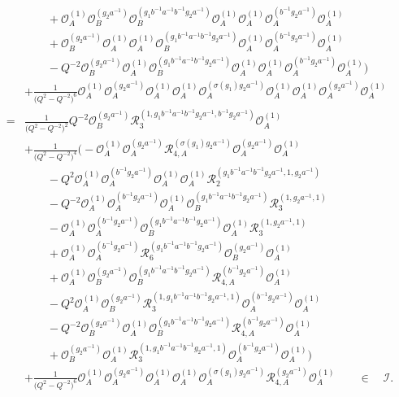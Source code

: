 \documentclass{amsart}
\newcommand{\Oa}{\mathcal O_A}
\newcommand{\Ob}{\mathcal O_B}
\newcommand{\R}{\mathcal R}
\begin{document}
\begin{align*}
&\qquad+\Oa^{(1)}\Ob^{(g_2a^{-1})}\Ob^{(g_1b^{-1}a^{-1}b^{-1}g_2a^{-1})}\Oa^{(1)}\Oa^{(1)}\Oa^{(b^{-1}g_2a^{-1})}\Oa^{(1)}\\
&\qquad+\Ob^{(g_2a^{-1})}\Oa^{(1)}\Oa^{(1)}\Ob^{(g_1b^{-1}a^{-1}b^{-1}g_2a^{-1})}\Oa^{(1)}\Oa^{(b^{-1}g_2a^{-1})}\Oa^{(1)}\\
&\qquad-Q^{-2}\Ob^{(g_2a^{-1})}\Oa^{(1)}\Ob^{(g_1b^{-1}a^{-1}b^{-1}g_2a^{-1})}\Oa^{(1)}\Oa^{(1)}\Oa^{(b^{-1}g_2a^{-1})}\Oa^{(1)}\Big)\\
&+\frac1{\big(Q^2-Q^{-2}\big)^6}\Oa^{(1)}\Oa^{(g_2a^{-1})}\Oa^{(1)}\Oa^{(1)}\Oa^{(\sigma(g_1)g_2a^{-1})}\Oa^{(1)}\Oa^{(1)}\Oa^{(g_2a^{-1})}\Oa^{(1)}\\
=&\frac1{\big(Q^2-Q^{-2}\big)^2}Q^{-2}\Ob^{(g_2a^{-1})}\R_{3}^{(1,g_1b^{-1}a^{-1}b^{-1}g_2a^{-1},b^{-1}g_2a^{-1})}\Oa^{(1)}\\
&+\frac1{\big(Q^2-Q^{-2}\big)^4}\Big(-\Oa^{(1)}\Oa^{(g_2a^{-1})}\R_{4,A}^{(\sigma(g_1)g_2a^{-1})}\Oa^{(g_2a^{-1})}\Oa^{(1)}\\
&\qquad-Q^2\Oa^{(1)}\Oa^{(b^{-1}g_2a^{-1})}\Oa^{(1)}\Oa^{(1)}\R_{2}^{(g_1b^{-1}a^{-1}b^{-1}g_2a^{-1},1,g_2a^{-1})}\\
&\qquad-Q^{-2}\Oa^{(1)}\Oa^{(b^{-1}g_2a^{-1})}\Oa^{(1)}\Ob^{(g_1b^{-1}a^{-1}b^{-1}g_2a^{-1})}\R_{3}^{(1,g_2a^{-1},1)}\\
&\qquad-\Oa^{(1)}\Oa^{(b^{-1}g_2a^{-1})}\Ob^{(g_1b^{-1}a^{-1}b^{-1}g_2a^{-1})}\Oa^{(1)}\R_{3}^{(1,g_2a^{-1},1)}\\
&\qquad+\Oa^{(1)}\Oa^{(b^{-1}g_2a^{-1})}\R_{6}^{(g_1b^{-1}a^{-1}b^{-1}g_2a^{-1})}\Ob^{(g_2a^{-1})}\Oa^{(1)}\\
&\qquad+\Oa^{(1)}\Ob^{(g_2a^{-1})}\Ob^{(g_1b^{-1}a^{-1}b^{-1}g_2a^{-1})}\R_{4,A}^{(b^{-1}g_2a^{-1})}\Oa^{(1)}\\
&\qquad-Q^2\Oa^{(1)}\Ob^{(g_2a^{-1})}\R_{3}^{(1,g_1b^{-1}a^{-1}b^{-1}g_2a^{-1},1)}\Oa^{(b^{-1}g_2a^{-1})}\Oa^{(1)}\\
&\qquad-Q^{-2}\Ob^{(g_2a^{-1})}\Oa^{(1)}\Ob^{(g_1b^{-1}a^{-1}b^{-1}g_2a^{-1})}\R_{4,A}^{(b^{-1}g_2a^{-1})}\Oa^{(1)}\\
&\qquad+\Ob^{(g_2a^{-1})}\Oa^{(1)}\R_{3}^{(1,g_1b^{-1}a^{-1}b^{-1}g_2a^{-1},1)}\Oa^{(b^{-1}g_2a^{-1})}\Oa^{(1)}\Big)\\
&+\frac1{\big(Q^2-Q^{-2}\big)^6}\Oa^{(1)}\Oa^{(g_2a^{-1})}\Oa^{(1)}\Oa^{(1)}\Oa^{(\sigma(g_1)g_2a^{-1})}\R_{4,A}^{(g_2a^{-1})}\Oa^{(1)}\qquad\in\quad\mathcal I.
\end{align*}



\end{document}
